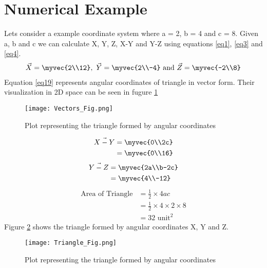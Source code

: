 \documentclass[journal,12pt]{IEEEtran}
\begin{document}
\section{Numerical Example}
Lets consider a example coordinate system where a = 2, b = 4 and c = 8. Given a, b and c we can calculate X, Y, Z, X-Y and Y-Z using equations \ref{eq1}, \ref{eq3} and \ref{eq4}.\\
\begin{align}
\vec{X} = \myvec{2\\12}, \text{ } \vec{Y} = \myvec{2\\-4} \text{ and } \vec{Z} = \myvec{-2\\8}
\label{eq19}
\end{align}
Equation \ref{eq19} represents angular coordinates of triangle in vector form. Their visualization in 2D space can be seen in fugure \ref{fig1}
\begin{figure}[h]
	\centering
	\texttt{[image: Vectors\_Fig.png]}
	\caption{Plot representing the triangle formed by angular coordinates}
	\label{fig1}
\end{figure}
\begin{align}
\begin{split}
\vec{X-Y} & = \myvec{0\\2c} \\
& = \myvec{0\\16}
\end{split}
\label{eq7}
\end{align}
\begin{align}
\begin{split}
\vec{Y-Z} & = \myvec{2a\\b-2c} \\
& = \myvec{4\\-12}
\end{split}
\label{eq8}
\end{align}
\begin{align}
\text{Area of Triangle} & = \frac{1}{2} \times 4ac \\
& = \frac{1}{2} \times 4 \times 2 \times 8 \\
& = 32 \text{ unit}^2
\label{eq9}
\end{align}
Figure \ref{fig2} shows the triangle formed by angular coordinates X, Y and Z.
\begin{figure}[h]
	\centering
	\texttt{[image: Triangle\_Fig.png]}
	\caption{Plot representing the triangle formed by angular coordinates}
	\label{fig2}
\end{figure}
\end{document}
